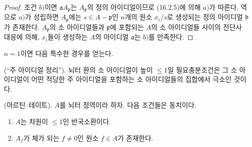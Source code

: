 \begin{proof}
조건 $b)$이면 $\mathfrak{a}A_{\mathfrak{p}}$는
$A_{\mathfrak{p}}$의 정의 아이디얼이므로 (16.2.5)에 의해 $a)$가
따른다. 역으로 $a)$가 성립하면 $A_{\mathfrak{p}}$에는
$s\in A-\mathfrak{p}$인 $n$개의 원소 $x_i/s$로 생성되는 정의
아이디얼 $\mathfrak{b}$가 존재한다. $A_{\mathfrak{p}}$의 소
아이디얼들과 $\mathfrak{p}$에 포함되는 $A$의 소 아이디얼들 사이의
전단사 대응에 의해, $x_i$들이 생성하는 $A$의 아이디얼
$\mathfrak{a}$는 $b)$를 만족한다.
\end{proof}


$n=1$이면 다음 특수한 경우를 얻는다.

\begin{corollary}[16.3.2]
\label{0.16.3.2-fr}
\textup{(``주 아이디얼 정리'').}
뇌터 환의 소 아이디얼이 높이 $\leq1$일 필요충분조건은 그 소
아이디얼이 어떤 적당한 주 아이디얼을 포함하는 소 아이디얼들의
집합에서 극소인 것이다.
\end{corollary}

\begin{corollary}[16.3.3]
\label{0.16.3.3-fr}
\textup{(아르틴--테이트).}
$A$를 뇌터 정역이라 하자. 다음 조건들은 동치이다.
\begin{enumerate}
  \item[$a)$] $A$는 차원이 $\leq1$인 반국소환이다.
  \item[$b)$] $A_f$가 체가 되는 $f\neq0$인 원소 $f\in A$가
  존재한다.
\end{enumerate}
\end{corollary}

